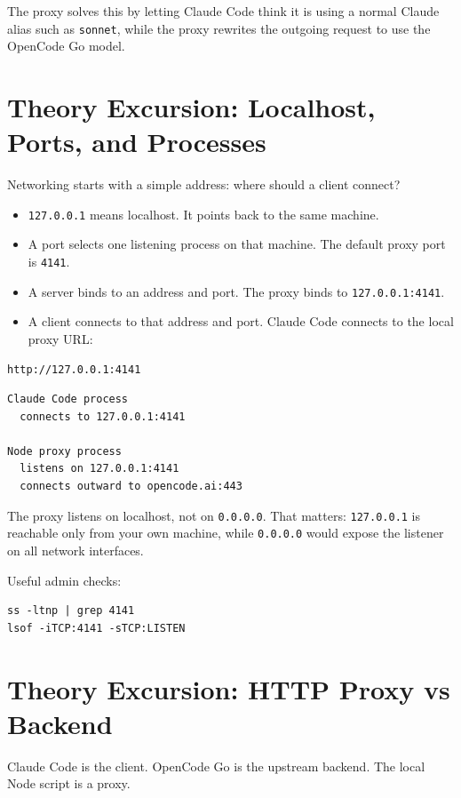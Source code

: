 \documentclass[11pt,a4paper]{article}
\newcommand{\code}[1]{\texttt{#1}}
\begin{document}
The proxy solves this by letting Claude Code think it is using a normal Claude
alias such as \code{sonnet}, while the proxy rewrites the outgoing request to
use the OpenCode Go model.

\section{Theory Excursion: Localhost, Ports, and Processes}

Networking starts with a simple address: where should a client connect?

\begin{itemize}
  \item \code{127.0.0.1} means localhost. It points back to the same machine.
  \item A port selects one listening process on that machine. The default proxy port is \code{4141}.
  \item A server binds to an address and port. The proxy binds to \code{127.0.0.1:4141}.
  \item A client connects to that address and port. Claude Code connects to the local proxy URL:
\end{itemize}

\begin{verbatim}
http://127.0.0.1:4141
\end{verbatim}

\begin{verbatim}
Claude Code process
  connects to 127.0.0.1:4141

Node proxy process
  listens on 127.0.0.1:4141
  connects outward to opencode.ai:443
\end{verbatim}

The proxy listens on localhost, not on \code{0.0.0.0}. That matters:
\code{127.0.0.1} is reachable only from your own machine, while
\code{0.0.0.0} would expose the listener on all network interfaces.

Useful admin checks:

\begin{verbatim}
ss -ltnp | grep 4141
lsof -iTCP:4141 -sTCP:LISTEN
\end{verbatim}

\section{Theory Excursion: HTTP Proxy vs Backend}

Claude Code is the client. OpenCode Go is the upstream backend. The local Node
script is a proxy.
\end{document}
